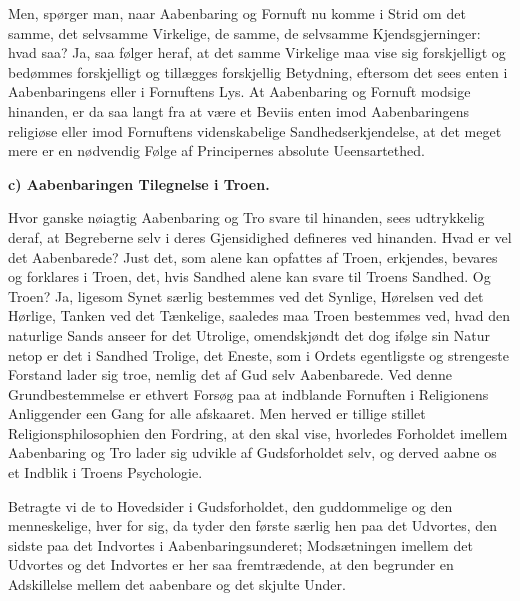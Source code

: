 \documentclass[12pt]{book}
\newcommand{\runhead}[1]{%
  \medskip\begin{center}{\bfseries #1}\end{center}\medskip}
\begin{document}
Men, spørger man, naar Aabenbaring og Fornuft nu komme i Strid om
det samme, det selvsamme Virkelige, de samme, de selvsamme
Kjendsgjerninger: hvad saa? Ja, saa følger heraf, at det samme
Virkelige maa vise sig forskjelligt og bedømmes forskjelligt og
tillægges forskjellig Betydning, eftersom det sees enten i
Aabenbaringens eller i Fornuftens Lys. At Aabenbaring og Fornuft
modsige hinanden, er da saa langt fra at være et Beviis
enten imod Aabenbaringens religiøse eller imod Fornuftens
videnskabelige Sandhedserkjendelse, at det meget mere er en
nødvendig Følge af Principernes absolute Ueensartethed.

\runhead{c) Aabenbaringen Tilegnelse i Troen.}

Hvor ganske nøiagtig Aabenbaring og Tro svare til hinanden, sees
udtrykkelig deraf, at Begreberne selv i deres Gjensidighed defineres
ved hinanden. Hvad er vel det Aabenbarede? Just det, som alene kan
opfattes af Troen, erkjendes, bevares og forklares i Troen, det,
hvis Sandhed alene kan svare til Troens Sandhed. Og Troen? Ja,
ligesom Synet særlig bestemmes ved det Synlige, Hørelsen ved det
Hørlige, Tanken ved det Tænkelige, saaledes maa Troen bestemmes ved,
hvad den naturlige Sands anseer for det Utrolige, omendskjøndt det
dog ifølge sin Natur netop er det i Sandhed Trolige, det Eneste, som
i Ordets egentligste og strengeste Forstand lader sig troe, nemlig
det af Gud selv Aabenbarede. Ved denne Grundbestemmelse er ethvert
Forsøg paa at indblande Fornuften i Religionens Anliggender een Gang
for alle afskaaret. Men herved er tillige stillet
Religionsphilosophien den Fordring, at den skal vise, hvorledes
Forholdet imellem Aabenbaring og Tro lader sig udvikle af
Gudsforholdet selv, og derved aabne os et Indblik i Troens
Psychologie.

Betragte vi de to Hovedsider i Gudsforholdet, den guddommelige og
den menneskelige, hver for sig, da tyder den første særlig hen paa
det Udvortes, den sidste paa det Indvortes i Aabenbaringsunderet;
Modsætningen imellem det Udvortes og det Indvortes er her saa
fremtrædende, at den begrunder en Adskillelse mellem det aabenbare
og det skjulte Under.
\end{document}
